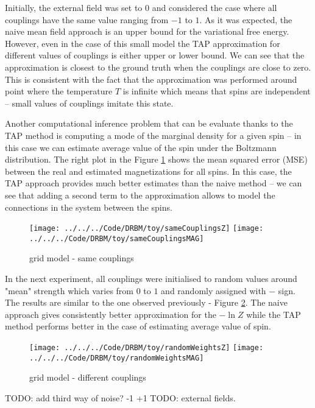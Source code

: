 \documentclass[../report/report.tex]{subfiles}
\begin{document}
Initially, the external field was set to $0$ and considered the case where all couplings have the same value ranging from $-1$ to $1$. As it was expected, the naive mean field approach is an upper bound for the variational free energy. However, even in the case of this small model the TAP approximation for different values of couplings is either upper or lower bound. We can see that the approximation is closest to the ground truth when the couplings are close to zero. This is consistent with the fact that the approximation was performed around point where the temperature $T$ is infinite which means that spins are independent -- small values of couplings imitate this state.

Another computational inference problem that can be evaluate thanks to the TAP method is computing a mode of the marginal density for a given spin -- in this case we can estimate average value of the spin under the Boltzmann distribution. The right plot in the Figure \ref{fig:gridModel} shows the mean squared error (MSE) between the real and estimated magnetizations for all spins. In this case, the TAP approach provides much better estimates than the naive method -- we can see that adding a second term to the approximation allows to model the connections in the system between the spins. 

\begin{figure}[!htb]
%
 \texttt{[image: ../../../Code/DRBM/toy/sameCouplingsZ]}
\endminipage 
{}  
 \texttt{[image: ../../../Code/DRBM/toy/sameCouplingsMAG]}
\endminipage\hfill
\label{fig:gridModel}
  \caption[1]{grid model - same couplings}
\end{figure}

In the next experiment, all couplings were initialised to random values around "mean" strength which varies from $0$ to $1$ and randomly assigned with $-$ sign. The results are similar to the one observed previously - Figure \ref{fig:gridModelCoup}. The naive approach gives consistently better approximation for the $-\ln Z$ while the TAP method performs better in the case of estimating average value of spin. 

\begin{figure}[!htb]
%
 \texttt{[image: ../../../Code/DRBM/toy/randomWeightsZ]}
\endminipage 
{}  
 \texttt{[image: ../../../Code/DRBM/toy/randomWeightsMAG]}
\endminipage\hfill
\label{fig:gridModelCoup}
  \caption[1]{grid model - different couplings}
\end{figure}
TODO: add third way of noise?  -1 +1
TODO: external fields.
\end{document}
